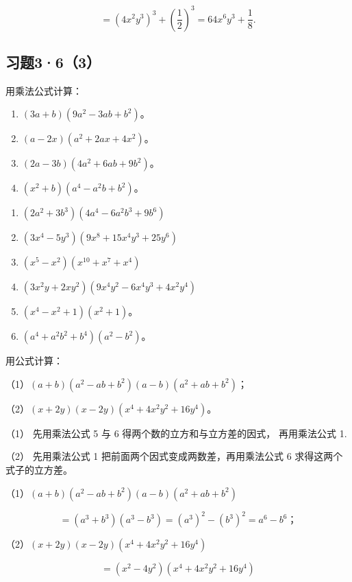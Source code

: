 \[
= (4 x ^{2} y ^{3}) ^{3} + \left(\frac{1}{2}\right) ^{3} = 64 x ^{6} y ^{3} + \frac{1}{8}.
\]

\subsection{习题3·6（3）}

用乘法公式计算：

\begin{enumerate}[start=1]
\item
  \((3a + b)(9a^2 - 3ab + b^2)\)。
\item
  \((a - 2x)(a^2 + 2ax + 4x^2)\)。
\item
  \((2a - 3b)(4a^2 + 6ab + 9b^2)\)。
\item
  \((x^2 + b)(a^4 - a^2b + b^2)\)。
\end{enumerate}

\begin{enumerate}[start=5]
\item
  \((2a^{2} + 3b^{3})(4a^{4} - 6a^{2}b^{3} + 9b^{6})\)
\item
  \((3x^{4} - 5y^{3})(9x^{8} + 15x^{4}y^{3} + 25y^{6})\)
\item
  \((x^{5} - x^{2})(x^{10} + x^{7} + x^{4})\)
\item
  \((3x^{2}y + 2xy^{2})(9x^{4}y^{2} - 6x^{4}y^{3} + 4x^{2}y^{4})\)
\item
  \((x^{4} - x^{2} + 1)(x^{2} + 1)\)。
\item
  \((a^{4} + a^{2}b^{2} + b^{4})(a^{2} - b^{2})\)。
\end{enumerate}

 用公式计算：

（1）\((a + b)(a^2 - ab + b^2)(a - b)(a^2 + ab + b^2)\)；

（2）\((x + 2y)(x - 2y)(x^4 + 4x^2y^2 + 16y^4)\)。

 （1） 先用乘法公式 5 与 6
得两个数的立方和与立方差的因式， 再用乘法公式 1.

（2） 先用乘法公式 1 把前面两个因式变成两数差，再用乘法公式 6
求得这两个式子的立方差。


（1）\((a + b)(a^2 - ab + b^2)(a - b)(a^2 + ab + b^2)\)

\[
= (a ^{3} + b ^{3}) (a ^{3} - b ^{3}) = (a ^{3}) ^{2} - (b ^{3}) ^{2} = a ^{6} - b ^{6}\text{；}
\]

（2）\((x + 2y)(x - 2y)(x^4 + 4x^2y^2 + 16y^4)\)

\[
= (x ^{2} - 4 y ^{2}) (x ^{4} + 4 x ^{2} y ^{2} + 16 y ^{4})
\]

